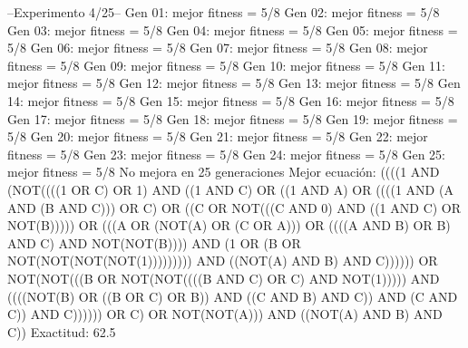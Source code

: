 --Experimento 
 4/25--
Gen 01: mejor fitness = 5/8
Gen 02: mejor fitness = 5/8
Gen 03: mejor fitness = 5/8
Gen 04: mejor fitness = 5/8
Gen 05: mejor fitness = 5/8
Gen 06: mejor fitness = 5/8
Gen 07: mejor fitness = 5/8
Gen 08: mejor fitness = 5/8
Gen 09: mejor fitness = 5/8
Gen 10: mejor fitness = 5/8
Gen 11: mejor fitness = 5/8
Gen 12: mejor fitness = 5/8
Gen 13: mejor fitness = 5/8
Gen 14: mejor fitness = 5/8
Gen 15: mejor fitness = 5/8
Gen 16: mejor fitness = 5/8
Gen 17: mejor fitness = 5/8
Gen 18: mejor fitness = 5/8
Gen 19: mejor fitness = 5/8
Gen 20: mejor fitness = 5/8
Gen 21: mejor fitness = 5/8
Gen 22: mejor fitness = 5/8
Gen 23: mejor fitness = 5/8
Gen 24: mejor fitness = 5/8
Gen 25: mejor fitness = 5/8
No mejora en 25 generaciones
Mejor ecuación: ((((1 AND (NOT((((1 OR C) OR 1) AND ((1 AND C) OR ((1 AND A) OR ((((1 AND (A AND (B AND C))) OR C) OR ((C OR NOT(((C AND 0) AND ((1 AND C) OR NOT(B))))) OR (((A OR (NOT(A) OR (C OR A))) OR ((((A AND B) OR B) AND C) AND NOT(NOT(B)))) AND (1 OR (B OR NOT(NOT(NOT(NOT(1))))))))) AND ((NOT(A) AND B) AND C)))))) OR NOT(NOT(((B OR NOT(NOT((((B AND C) OR C) AND NOT(1))))) AND ((((NOT(B) OR ((B OR C) OR B)) AND ((C AND B) AND C)) AND (C AND C)) AND C)))))) OR C) OR NOT(NOT(A))) AND ((NOT(A) AND B) AND C))
 Exactitud: 62.5%

